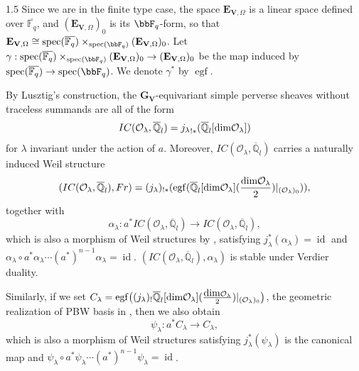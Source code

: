 \documentclass[10pt]{amsart}
\def\dim{\mbox{\rm dim}}   \def\End{\mbox{\rm End}}
\newcommand\mo{{\mathcal{O}}}
\begin{document}
\begin{spacing}{1.5}
Since we are in the finite type case, the space $\mathbf{E}_{\mathbf{V},\Omega}$ is a linear space defined over $\overline{\mathbb{F}_{q}}$, and $(\mathbf{E}_{\mathbf{V},\Omega})_0$ is its $\bbF_q$-form, so that $\mathbf{E}_{\mathbf{V},\Omega}\cong \operatorname{spec}(\overline{\mathbb{F}_{q}})\times_{\operatorname{spec}(\bbF_q)}(\mathbf{E}_{\mathbf{V},\Omega})_0$. Let $\gamma:\operatorname{spec}(\overline{\mathbb{F}_{q}})\times_{\operatorname{spec}(\bbF_q)}(\mathbf{E}_{\mathbf{V},\Omega})_0\rightarrow (\mathbf{E}_{\mathbf{V},\Omega})_0$ be the map induced by $\operatorname{spec}(\overline{\mathbb{F}_{q}})\rightarrow \operatorname{spec}(\bbF_q)$. We denote $\gamma^*$ by $\operatorname{egf}$.

By Lusztig's construction, the $\mathbf{G}_{\mathbf{V}}$-equivariant simple perverse sheaves without traceless summands are all of the form
\[
IC(\mathcal{O}_{\lambda}, \overline{\mathbb{Q}}_l)={j_{\lambda}}_{!*}(\overline{\mathbb{Q}}_l[\dim \mo_{\lambda}])
\]
for $\lambda$ invariant under the action of $a$. Moreover, $IC(\mathcal{O}_{\lambda}, \overline{\mathbb{Q}}_l)$ carries a naturally induced Weil structure
\[
(IC(\mathcal{O}_{\lambda}, \overline{\mathbb{Q}}_l), Fr)=(j_\lambda)_{!*}(\operatorname{egf}(\overline{\mathbb{Q}}_l[\dim \mo_{\lambda}](\frac{\dim\mo_{\lambda}}{2})|_{(\mo_{\lambda})_0})),
\]
together with
\[
\alpha_{\lambda} : a^* IC(\mathcal{O}_{\lambda}, \overline{\mathbb{Q}}_l) \to IC(\mathcal{O}_{\lambda}, \overline{\mathbb{Q}}_l),
\]
which is also a morphism of Weil structures by \cite{lusztig1998canonical}, satisfying $j_{\lambda}^*(\alpha_{\lambda})=\operatorname{id}$ and $\alpha_{\lambda}\circ a^*\alpha_{\lambda}\cdots (a^*)^{n-1}\alpha_{\lambda}=\operatorname{id}$. $(IC(\mathcal{O}_{\lambda}, \overline{\mathbb{Q}}_l),\alpha_{\lambda})$ is stable under Verdier duality.

Similarly, if we set $C_{\lambda}=\operatorname{egf}\bigl((j_{\lambda})_! \overline{\mathbb{Q}}_l[\dim \mo_{\lambda}](\frac{\dim\mo_{\lambda}}{2}) |_{(\mathcal{O}_{\lambda})_0}\bigr)$, the geometric realization of PBW basis in \cite{lan2025structurecoefficientsquantumgroups}, then we also obtain
\[
\psi_{\lambda} : a^* C_{\lambda} \to C_{\lambda},
\]
which is also a morphism of Weil structures satisfying $j_{\lambda}^*(\psi_{\lambda})$ is the canonical map and $\psi_{\lambda}\circ a^*\psi_{\lambda}\cdots (a^*)^{n-1}\psi_{\lambda}=\operatorname{id}$. 


\end{spacing}
\end{document}

